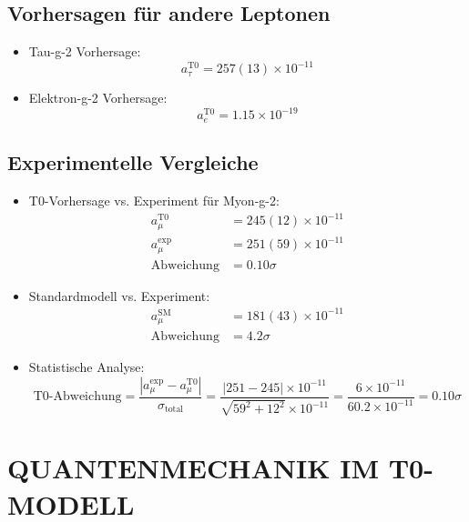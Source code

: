 \documentclass[12pt,a4paper]{article}
\begin{document}
	\subsection{Vorhersagen für andere Leptonen}
	\begin{itemize}
		\item Tau-g-2 Vorhersage:
		\begin{equation}
			a_\tau^{\text{T0}} = 257(13) \times 10^{-11}
		\end{equation}
		
		\item Elektron-g-2 Vorhersage:
		\begin{equation}
			a_e^{\text{T0}} = 1.15 \times 10^{-19}
		\end{equation}
	\end{itemize}
	
	\subsection{Experimentelle Vergleiche}
	\begin{itemize}
		\item T0-Vorhersage vs. Experiment für Myon-g-2:
		\begin{align}
			a_\mu^{\text{T0}} &= 245(12) \times 10^{-11} \\
			a_\mu^{\text{exp}} &= 251(59) \times 10^{-11} \\
			\text{Abweichung} &= 0.10\sigma
		\end{align}
		
		\item Standardmodell vs. Experiment:
		\begin{align}
			a_\mu^{\text{SM}} &= 181(43) \times 10^{-11} \\
			\text{Abweichung} &= 4.2\sigma
		\end{align}
		
		\item Statistische Analyse:
		\begin{equation}
			\text{T0-Abweichung} = \frac{|a_\mu^{\text{exp}} - a_\mu^{\text{T0}}|}{\sigma_{\text{total}}} = \frac{|251 - 245| \times 10^{-11}}{\sqrt{59^2 + 12^2} \times 10^{-11}} = \frac{6 \times 10^{-11}}{60.2 \times 10^{-11}} = 0.10\sigma
		\end{equation}
	\end{itemize}
	
	\section{QUANTENMECHANIK IM T0-MODELL}
	
\end{document}
